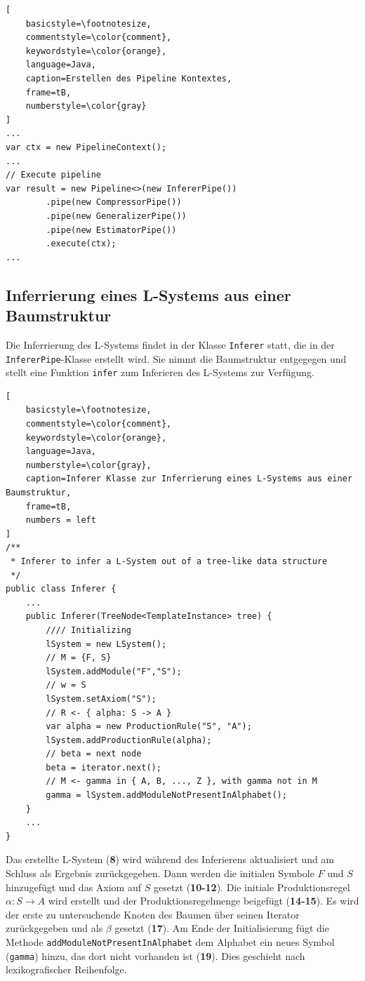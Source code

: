 \newpage

\begin{lstlisting}[
    basicstyle=\footnotesize,
    commentstyle=\color{comment},
    keywordstyle=\color{orange},
    language=Java,
    caption=Erstellen des Pipeline Kontextes,
    frame=tB,
    numberstyle=\color{gray}
]
...
var ctx = new PipelineContext();
...
// Execute pipeline
var result = new Pipeline<>(new InfererPipe())
        .pipe(new CompressorPipe())
        .pipe(new GeneralizerPipe())
        .pipe(new EstimatorPipe())
        .execute(ctx);
...
\end{lstlisting}

\subsection*{Inferrierung eines L-Systems aus einer Baumstruktur}
Die Inferrierung des L-Systems findet in der Klasse \texttt{Inferer} statt, die in der \texttt{InfererPipe}-Klasse erstellt wird.
Sie nimmt die Baumstruktur entgegegen und stellt eine Funktion \texttt{infer} zum Inferieren des L-Systems zur Verfügung.
\begin{lstlisting}[
    basicstyle=\footnotesize,
    commentstyle=\color{comment},
    keywordstyle=\color{orange},
    language=Java,
    numberstyle=\color{gray},
    caption=Inferer Klasse zur Inferrierung eines L-Systems aus einer Baumstruktur,
    frame=tB,
    numbers = left
]
/**
 * Inferer to infer a L-System out of a tree-like data structure
 */
public class Inferer {
    ...
    public Inferer(TreeNode<TemplateInstance> tree) {
        //// Initializing
        lSystem = new LSystem();
        // M = {F, S}
        lSystem.addModule("F","S");
        // w = S
        lSystem.setAxiom("S");
        // R <- { alpha: S -> A }
        var alpha = new ProductionRule("S", "A");
        lSystem.addProductionRule(alpha);
        // beta = next node
        beta = iterator.next();
        // M <- gamma in { A, B, ..., Z }, with gamma not in M
        gamma = lSystem.addModuleNotPresentInAlphabet();
    }
    ...
}
\end{lstlisting}

Das erstellte L-System (\textbf{8}) wird während des Inferierens aktualisiert und am Schluss als Ergebnis zurückgegeben.
Dann werden die initialen Symbole $F$ und $S$ hinzugefügt und das Axiom auf $S$ gesetzt (\textbf{10-12}).
Die initiale Produktionsregel $\alpha: S \rightarrow A$ wird erstellt und der Produktionsregelmenge beigefügt (\textbf{14-15}).
Es wird der erste zu untersuchende Knoten des Baumen über seinen Iterator zurückgegeben und als $\beta$ gesetzt (\textbf{17}).
Am Ende der Initialisierung fügt die Methode \texttt{addModuleNotPresentInAlphabet} dem Alphabet ein neues Symbol (\texttt{gamma}) hinzu,
das dort nicht vorhanden ist (\textbf{19}).
Dies geschieht nach lexikografischer Reihenfolge.

